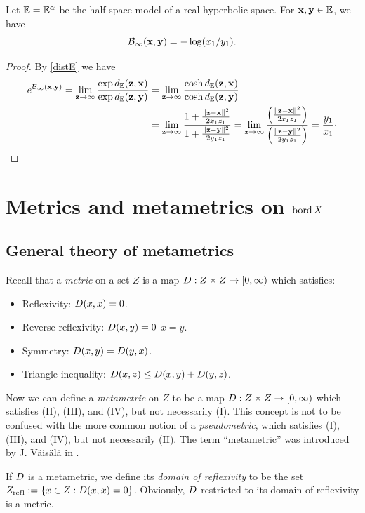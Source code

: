\begin{proposition}
\label{propositionbusemannE}
Let $\E = \E^\alpha$ be the half-space model of a real hyperbolic space. For $\xx,\yy\in\E$, we have
\[
\operatorname{\mathcal B}_\infty(\mathbf x,\mathbf y) = -\log(x_1/y_1).
\]
\end{proposition}
\begin{proof}
By \eqref{distE} we have
\begin{align*}
e^{\busemann_\infty(\xx,\yy)}
= \lim_{\zz\to\infty} \frac{\exp\dist_\E(\zz,\xx)}{\exp\dist_\E(\zz,\yy)}
&= \lim_{\zz\to\infty} \frac{\cosh\dist_\E(\zz,\xx)}{\cosh\dist_\E(\zz,\yy)}\\
&= \lim_{\zz\to\infty} \frac{1 + \frac{\|\zz - \xx\|^2}{2 x_1 z_1}}{1 + \frac{\|\zz - \yy\|^2}{2 y_1 z_1}}
= \lim_{\zz\to\infty} \frac{\left(\frac{\|\zz - \xx\|^2}{2 x_1 z_1}\right)}{\left(\frac{\|\zz - \yy\|^2}{2 y_1 z_1}\right)}
= \frac{y_1}{x_1}\cdot
\end{align*}
\end{proof}



\bigskip
\section{Metrics and metametrics on $\operatorname{bord} X$}
\label{subsectionmetametrics}

\subsection{General theory of metametrics}

\begin{definition}
\label{definitionmetametric}
Recall that a \emph{metric} on a set $Z$ is a map $D:Z\times Z\to{[0,\infty)}$ which satisfies:
\begin{itemize}
\item[(I)] Reflexivity: $D(x,x) = 0$.
\item[(II)] Reverse reflexivity: $D(x,y) = 0$ \implies $x = y$.
\item[(III)] Symmetry: $D(x,y) = D(y,x)$.
\item[(IV)] Triangle inequality: $D(x,z) \leq D(x,y) + D(y,z)$.
\end{itemize}
Now we can define a \emph{metametric} on $Z$ to be a map $D: Z\times Z\to{[0,\infty)}$ which satisfies (II), (III), and (IV), but not necessarily (I). This concept is not to be confused with the more common notion of a \emph{pseudometric}, which satisfies (I), (III), and (IV), but not necessarily (II). The term ``metametric'' was introduced by J. V\"ais\"al\"a in \cite{Vaisala}.

If $D$ is a metametric, we define its \emph{domain of reflexivity} to be the set $Z_{\mathrm{ref \hspace{0 in} l}} := \{x\in Z:D(x,x) = 0\}$. Obviously, $D$ restricted to its domain of reflexivity is a metric.
\end{definition}

